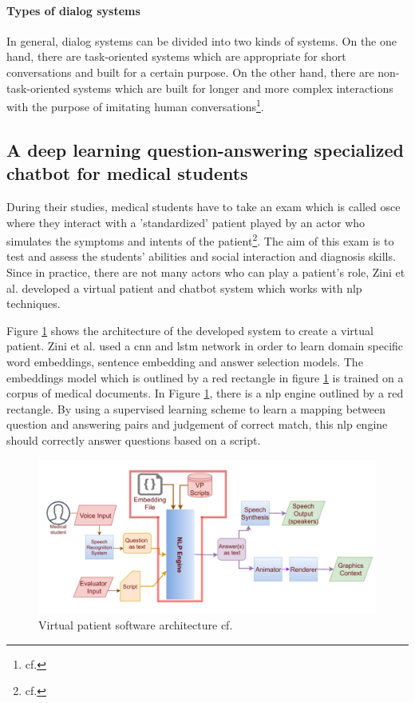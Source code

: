 \paragraph{Types of dialog systems}
In general, dialog systems can be divided into two kinds of systems. On the one hand, there are task-oriented systems which are appropriate for short conversations and built for a certain purpose. On the other hand, there are non-task-oriented systems which are built for longer and more complex interactions with the purpose of imitating human conversations\footnote{cf.\autocite{akhtar}}.

\subsection{A deep learning question-answering specialized chatbot for medical students}
During their studies, medical students have to take an exam which is called \ac{osce} where they interact with a 'standardized' patient played by an actor who simulates the symptoms and intents of the patient\footnote{cf.\autocite{zini}}. The aim of this exam is to test and assess the students' abilities and social interaction and diagnosis skills.
Since in practice, there are not many actors who can play a patient's role, Zini et al. developed a virtual patient and chatbot system which works with \ac{nlp} techniques.

Figure \ref{vp_architecture} shows the architecture of the developed system to create a virtual patient. Zini et al. used a \ac{cnn} and \ac{lstm} network in order to learn domain specific word embeddings, sentence embedding and answer selection models.
The embeddings model which is outlined by a red rectangle in figure \ref{vp_architecture} is trained on a corpus of medical documents.
In Figure \ref{vp_architecture}, there is a \ac{nlp} engine outlined by a red rectangle. By using a supervised learning scheme to learn a mapping between question and answering pairs and judgement of correct match, this \ac{nlp} engine should correctly answer questions based on a script.

\begin{figure}[htbp]
	\centering
	\includegraphics[width=1\textwidth]{images/vp_architecture.png}
	\caption{Virtual patient software architecture cf.\autocite{zini}}
	\label{vp_architecture}
\end{figure}

